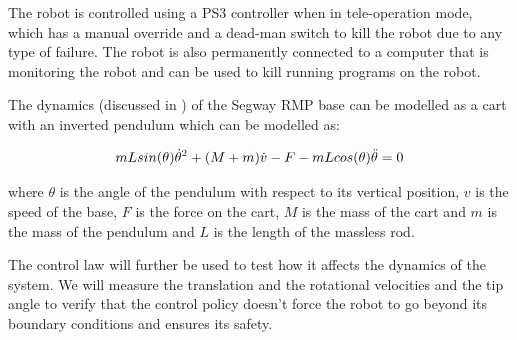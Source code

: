 \documentclass[journal]{IEEEtran}
\begin{document}
The robot is controlled using a PS3 controller when in tele-operation mode, which has a manual override and a dead-man switch to kill the robot due to any type of failure. The robot is also permanently connected to a computer that is monitoring the robot and can be used to kill running programs on the robot.

The dynamics (discussed in \cite{castro2012modeling}) of the Segway RMP base can be modelled as a cart with an inverted pendulum which can be modelled as:

\begin{equation}
\centering
 mLsin(\theta)\dot{\theta}^2 + (M+m)\dot{v} - F - mLcos(\theta)\ddot{\theta} = 0 
\end{equation}

where $\theta$ is the angle of the pendulum with respect to its vertical position, $v$ is the speed of the base, $F$ is the force on the cart, $M$ is the mass of the cart and $m$ is the mass of the pendulum and $L$ is the length of the massless rod.

The control law will further be used to test how it affects the dynamics of the system. We will measure the translation and the rotational velocities and the tip angle to verify that the control policy doesn't force the robot to go beyond its boundary conditions and ensures its safety.
\end{document}
